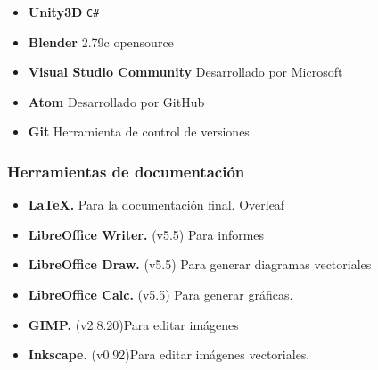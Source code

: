 \begin{itemize}
    \item \textbf{Unity3D} \texttt{C\#}
    \item \textbf{Blender} 2.79c opensource
    \item \textbf{Visual Studio Community} Desarrollado por Microsoft
    \item \textbf{Atom} Desarrollado por GitHub
    \item \textbf{Git} Herramienta de control de versiones
\end{itemize}

\subsubsection{Herramientas de documentación}

\begin{itemize}
    \item \textbf{\LaTeX.} Para la documentación final. Overleaf
    \item \textbf{LibreOffice Writer.} (v5.5) Para informes 
    \item \textbf{LibreOffice Draw.} (v5.5) Para generar diagramas vectoriales
    \item \textbf{LibreOffice Calc.} (v5.5) Para generar gráficas.
    \item \textbf{GIMP.} (v2.8.20)Para editar imágenes
    \item \textbf{Inkscape.} (v0.92)Para editar imágenes vectoriales.
\end{itemize}